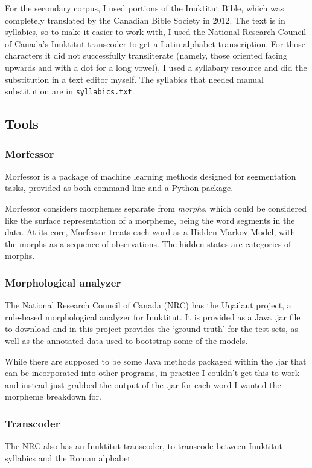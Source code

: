 \documentclass[10pt]{article}
\begin{document}
For the secondary corpus, I used portions of the Inuktitut Bible, which was completely translated by the Canadian Bible Society in 2012.\cite{bible} The text is in syllabics, so to make it easier to work with, I used the National Research Council of Canada's Inuktitut transcoder to get a Latin alphabet transcription. For those characters it did not successfully transliterate (namely, those oriented facing upwards and with a dot for a long vowel), I used a syllabary resource\cite{syllabics} and did the substitution in a text editor myself. The syllabics that needed manual substitution are in \texttt{syllabics.txt}.

\subsection{Tools}

\subsubsection{Morfessor}
Morfessor\cite{morfessor} is a package of machine learning methods designed for segmentation tasks, provided as both command-line and a Python package.

Morfessor considers morphemes separate from \emph{morphs}, which could be considered like the surface representation of a morpheme, being the word segments in the data. At its core, Morfessor treats each word as a Hidden Markov Model, with the morphs as a sequence of observations. The hidden states are categories of morphs.\cite{formula}

\subsubsection{Morphological analyzer}
The National Research Council of Canada (NRC) has the Uqailaut project, a rule-based morphological analyzer for Inuktitut.\cite{analyzer} It is provided as a Java .jar file to download and in this project provides the `ground truth' for the test sets, as well as the annotated data used to bootstrap some of the models.

While there are supposed to be some Java methods packaged within the .jar that can be incorporated into other programs, in practice I couldn't get this to work and instead just grabbed the output of the .jar for each word I wanted the morpheme breakdown for.\cite{exec_cmd_java}

\subsubsection{Transcoder}
The NRC also has an Inuktitut transcoder, to transcode between Inuktitut syllabics and the Roman alphabet.\cite{transcoder}
\end{document}
